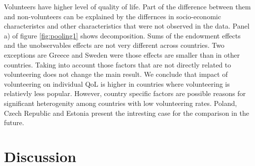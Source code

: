 \documentclass[10pt, letterpaper]{article}
\begin{document}
\begin{spacing}{1.4}
Volunteers have higher level of quality of life. Part of the difference between them and non-volunteers can be explained by the differnces in socio-economic characteristcs and other characteristics that were not observed in the data. Panel a) of figure \ref{fig:pooling1} shows decomposition. Sums of the endowment effects and the unobservables effects are not very different across countries. Two exceptions are Greece and Sweden were those effects are smaller than in other countries. Taking into account those factors that are not directly related to volunteering does not change the main result. We conclude that impact of volunteering on individual QoL is higher in countries where volunteering is relatievly less popular. However, country specific factors are possible reasons for significant heterogenity among countries with low volunteering rates. Poland, Czech Republic and Estonia present the intresting case for the comparison in the future.   
 
\section{Discussion}


\end{spacing}
\end{document}
